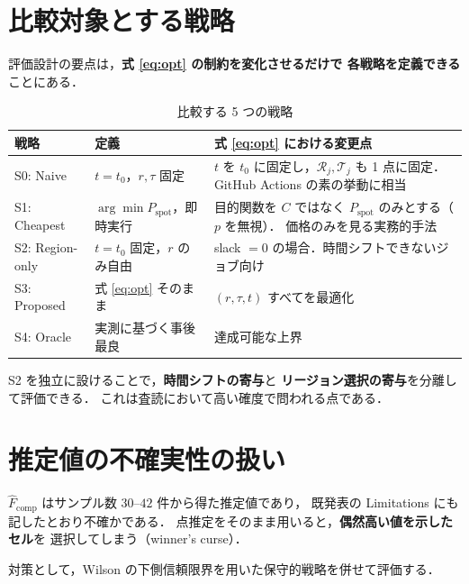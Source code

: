 \documentclass[11pt,a4paper]{ltjsarticle}
\newcommand{\Pspot}{P_{\mathrm{spot}}}
\begin{document}
\section{比較対象とする戦略}
\label{sec:baseline}

評価設計の要点は，\textbf{式 \eqref{eq:opt} の制約を変化させるだけで
各戦略を定義できる}ことにある．

\begin{table}[htbp]
\centering
\caption{比較する 5 つの戦略}
\label{tab:strategies}
\begin{tabularx}{\textwidth}{@{}llX@{}}
\toprule
戦略 & 定義 & 式 \eqref{eq:opt} における変更点 \\
\midrule
S0: Naive
  & $t=t_0$，$r,\tau$ 固定
  & $t$ を $t_0$ に固定し，$\mathcal{R}_j,\mathcal{T}_j$ も 1 点に固定．
    GitHub Actions の素の挙動に相当 \\
\addlinespace
S1: Cheapest
  & $\arg\min \Pspot$，即時実行
  & 目的関数を $C$ ではなく $\Pspot$ のみとする（$p$ を無視）．
    価格のみを見る実務的手法 \\
\addlinespace
S2: Region-only
  & $t=t_0$ 固定，$r$ のみ自由
  & slack $=0$ の場合．時間シフトできないジョブ向け \\
\addlinespace
S3: Proposed
  & 式 \eqref{eq:opt} そのまま
  & $(r,\tau,t)$ すべてを最適化 \\
\addlinespace
S4: Oracle
  & 実測に基づく事後最良
  & 達成可能な上界 \\
\bottomrule
\end{tabularx}
\end{table}

S2 を独立に設けることで，\textbf{時間シフトの寄与}と
\textbf{リージョン選択の寄与}を分離して評価できる．
これは査読において高い確度で問われる点である．

\section{推定値の不確実性の扱い}

$\hat{F}_{\mathrm{comp}}$ はサンプル数 $30$--$42$ 件から得た推定値であり，
既発表の Limitations にも記したとおり不確かである．
点推定をそのまま用いると，\textbf{偶然高い値を示したセル}を
選択してしまう（winner's curse）．

対策として，Wilson の下側信頼限界を用いた保守的戦略を併せて評価する．
\end{document}
